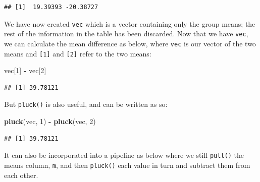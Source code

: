 \documentclass[]{book}
\newenvironment{Shaded}{\begin{snugshade}}{\end{snugshade}}
\newcommand{\CommentTok}[1]{\textcolor[rgb]{0.56,0.35,0.01}{\textit{#1}}}
\newcommand{\DecValTok}[1]{\textcolor[rgb]{0.00,0.00,0.81}{#1}}
\newcommand{\KeywordTok}[1]{\textcolor[rgb]{0.13,0.29,0.53}{\textbf{#1}}}
\newcommand{\NormalTok}[1]{#1}
\newcommand{\OperatorTok}[1]{\textcolor[rgb]{0.81,0.36,0.00}{\textbf{#1}}}
\newcommand{\StringTok}[1]{\textcolor[rgb]{0.31,0.60,0.02}{#1}}
\begin{document}
\begin{Shaded}
\end{Shaded}

\begin{verbatim}
## [1]  19.39393 -20.38727
\end{verbatim}

We have now created \texttt{vec} which is a vector containing only the group means; the rest of the information in the table has been discarded. Now that we have \texttt{vec}, we can calculate the mean difference as below, where \texttt{vec} is our vector of the two means and \texttt{{[}1{]}} and \texttt{{[}2{]}} refer to the two means:

\begin{Shaded}
\begin{Highlighting}[]
\NormalTok{vec[}\DecValTok{1}\NormalTok{] }\OperatorTok{-}\StringTok{ }\NormalTok{vec[}\DecValTok{2}\NormalTok{]}
\end{Highlighting}
\end{Shaded}

\begin{verbatim}
## [1] 39.78121
\end{verbatim}

But \texttt{pluck()} is also useful, and can be written as so:

\begin{Shaded}
\begin{Highlighting}[]
\KeywordTok{pluck}\NormalTok{(vec, }\DecValTok{1}\NormalTok{) }\OperatorTok{-}\StringTok{ }\KeywordTok{pluck}\NormalTok{(vec, }\DecValTok{2}\NormalTok{)}
\end{Highlighting}
\end{Shaded}

\begin{verbatim}
## [1] 39.78121
\end{verbatim}

It can also be incorporated into a pipeline as below where we still \texttt{pull()} the means column, \texttt{m}, and then \texttt{pluck()} each value in turn and subtract them from each other.

\begin{Shaded}
\end{Shaded}
\end{document}
